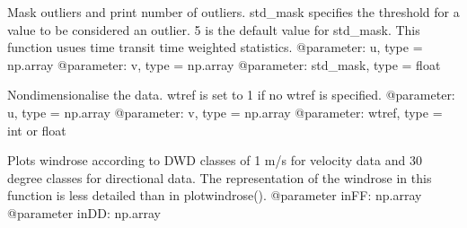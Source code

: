 \documentclass[letterpaper,10pt,english]{sphinxmanual}
\begin{document}

\begin{fulllineitems}
\label{\detokenize{index:windtunnel.mask_outliers_wght}}
Mask outliers and print number of outliers. std\_mask specifies the
threshold for a value to be considered an outlier. 5 is the default 
value for std\_mask. This function usues time transit time weighted 
statistics.
@parameter: u, type = np.array
@parameter: v, type = np.array
@parameter: std\_mask, type = float

\end{fulllineitems}


\begin{fulllineitems}
\label{\detokenize{index:windtunnel.nondimensionalise}}
Nondimensionalise the data. wtref is set to 1 if no wtref is 
specified.
@parameter: u, type = np.array
@parameter: v, type = np.array
@parameter: wtref, type = int or float

\end{fulllineitems}


\begin{fulllineitems}
\label{\detokenize{index:windtunnel.plot_DWD_windrose}}
Plots windrose according to DWD classes of 1 m/s for velocity data and
30 degree classes for directional data. The representation of the windrose 
in this function is less detailed than in plotwindrose().
@parameter inFF: np.array
@parameter inDD: np.array

\end{fulllineitems}

\end{document}
